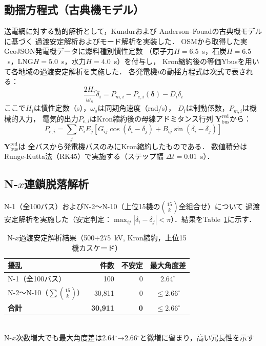 \documentclass[fleqn]{ieej}
\begin{document}
\subsection{動揺方程式（古典機モデル）}

送電網に対する動的解析として，Kundur\cite{kundur1994}および
Anderson--Fouad\cite{anderson2003}の古典機モデルに基づく
過渡安定解析およびモード解析を実装した．
OSMから取得した実GeoJSON発電機データに燃料種別慣性定数
（原子力$H=6.5$~s，石炭$H=6.5$~s，LNG$H=5.0$~s，水力$H=4.0$~s）を付与し，
Kron縮約後の等価Ybusを用いて各地域の過渡安定解析を実施した．
各発電機$i$の動揺方程式は次式で表される：
\begin{equation}
  \frac{2H_i}{\omega_s}\ddot{\delta}_i
  = P_{m,i} - P_{e,i}(\boldsymbol{\delta}) - D_i\dot{\delta}_i
  \label{eq:swing}
\end{equation}
ここで$H_i$は慣性定数（s），$\omega_s$は同期角速度（rad/s），
$D_i$は制動係数，$P_{m,i}$は機械的入力，
電気的出力$P_{e,i}$はKron縮約後の母線アドミタンス行列
$\mathbf{Y}_{\mathrm{bus}}^{\mathrm{red}}$から：
\begin{equation}
  P_{e,i} = \sum_j E_i E_j
  \!\left[G_{ij}\cos(\delta_i-\delta_j)+B_{ij}\sin(\delta_i-\delta_j)\right]
  \label{eq:Pe}
\end{equation}
$\mathbf{Y}_{\mathrm{bus}}^{\mathrm{red}}$は
全バスから発電機バスのみにKron縮約したものである．
数値積分はRunge-Kutta法（RK45）で実施する（ステップ幅 $\Delta t=0.01$~s）．

\subsection{N-$x$連鎖脱落解析}

N-1（全100バス）およびN-2〜N-10（上位15機の$\binom{15}{k}$全組合せ）について
過渡安定解析を実施した（安定判定：$\max_{ij}|\delta_i-\delta_j|<\pi$）．結果をTable~\ref{tab:nx}に示す．

\begin{table}[t]
  \caption{N-$x$過渡安定解析結果（500+275~kV, Kron縮約，上位15機カスケード）}
  \label{tab:nx}
  \centering\small
  \begin{tabular}{lrrc}
    \toprule
    擾乱 & 件数 & 不安定 & 最大角度差 \\
    \midrule
    N-1（全100バス） & 100 & 0 & $2.64^\circ$ \\
    N-2〜N-10（$\sum\binom{15}{k}$） & 30{,}811 & 0 & $\leq2.66^\circ$ \\
    \midrule
    \textbf{合計} & \textbf{30{,}911} & \textbf{0} & $\leq2.66^\circ$ \\
    \bottomrule
  \end{tabular}\\[2pt]
  {\scriptsize N-$x$次数増大でも最大角度差は2.64$^\circ$→2.66$^\circ$と微増に留まり，高い冗長性を示す}
\end{table}
\end{document}
